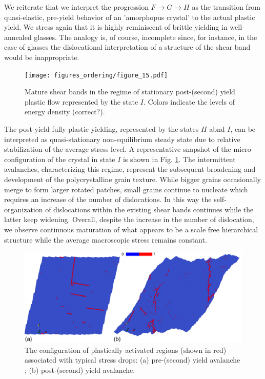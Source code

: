 \documentclass[aps,
superscriptaddress,notitlepage]{revtex4-1}
\begin{document}
We reiterate that  we interpret the progression  $F \to G \to H$ as the transition from quasi-elastic, pre-yield  behavior of an 'amorphopus crystal' to the actual plastic yield. We stress again that  it is  highly reminiscent of  brittle yielding in  well-annealed glasses.  The analogy is, of course,  incomplete since, for instance,  in the case of glasses the dislocational interpretation of a  structure of the shear band  would be   inappropriate.

 
\begin{figure}[h!]
\texttt{[image: figures\_ordering/figure\_15.pdf]}
\caption{ Mature shear bands in the regime of stationary post-(second) yield plastic flow represented by the state $I$. Colors indicate the levels of energy density (correct?).
}
\label{fig:04}
\end{figure}






The post-yield fully plastic yielding, represented by the states $H$ abnd $I$,  can be interpreted as quasi-stationary non-equilibrium steady state  due to relative stabilization of the average stress level. A representative snapshot of the micro-configuration of the crystal in state $I$ is shown in  Fig. \ref{fig:04}. The   intermittent avalanches,  characterizing this regime,  represent the subsequent broadening and development of  the polycrystalline grain texture.  While bigger grains  occasionally merge to form larger rotated patches,  small grains continue to nucleate which requires an  increase of the number of dislocations. In this way the self-organization of dislocations within the existing shear bands continues while the latter keep  widening. Overall, despite the increase in the  number of dislocation, we observe  continuous maturation of what appears to be  a scale free hierarchical  structure while  the average macroscopic stress remains constant.
\begin{figure}[h!]
\includegraphics[scale=.1]{figures_ordering/figure_16.pdf}
\caption{The configuration of plastically activated  regions (shown in red) associated with typical stress drops: (a)   pre-(second) yield avalanche ;  (b)  post-(second) yield avalanche.}
\label{fig:plastification}
\end{figure}
\end{document}
